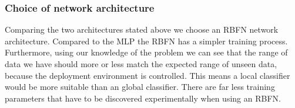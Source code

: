 \documentclass[a4paper, 11pt]{article}
\begin{document}


\subsubsection{Choice of network architecture}
Comparing the two architectures stated above we choose an RBFN network architecture. Compared to the MLP the RBFN has a simpler training process. Furthermore, using our knowledge of the problem we can see that the range of data we have should more or less match the expected range of unseen data, because the deployment environment is controlled. This means a local classifier would be more suitable than an global classifier. There are far less training parameters that have to be discovered experimentally when using an RBFN.
\end{document}
